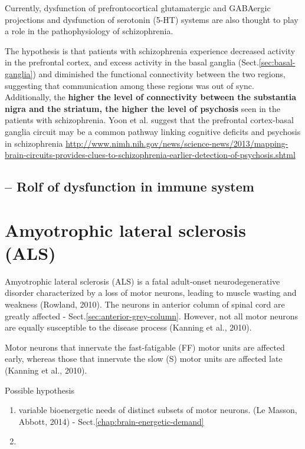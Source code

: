 Currently, dysfunction of prefrontocortical glutamatergic and GABAergic
projections and dysfunction of serotonin (5-HT) systems are also thought to play
a role in the pathophysiology of schizophrenia.

The hypothesis is that patients with schizophrenia experience decreased activity
in the prefrontal cortex, and excess activity in the basal ganglia
(Sect.\ref{sec:basal-ganglia}) and diminished the functional connectivity
between the two regions, suggesting that communication among these regions was
out of sync.
Additionally, the {\bf higher the level of connectivity between the substantia
nigra and the striatum, the higher the level of psychosis} seen in the patients
with schizophrenia.  Yoon et al.
suggest that the prefrontal cortex-basal ganglia circuit may be a common pathway
linking cognitive deficits and psychosis in schizophrenia
\citep{yoon2013}
\url{http://www.nimh.nih.gov/news/science-news/2013/mapping-brain-circuits-provides-clues-to-schizophrenia-earlier-detection-of-psychosis.shtml}


\subsection{ -- Rolf of dysfunction in immune system}
\label{sec:schizophrenia-hypothesis-immune-role}
\section{Amyotrophic lateral sclerosis (ALS)}
\label{sec:ALS}

Amyotrophic lateral sclerosis (ALS) is a fatal adult-onset neurodegenerative
disorder characterized by a loss of motor neurons, leading to muscle wasting and
weakness (Rowland, 2010). The neurons in anterior column of spinal cord are
greatly affected - Sect.\ref{sec:anterior-grey-column}.
However, not all motor neurons are equally susceptible to the disease process
(Kanning et al., 2010).

Motor neurons that innervate the fast-fatigable (FF) motor units are affected
early, whereas those that innervate the slow (S) motor units are affected late
(Kanning et al., 2010). 

Possible hypothesis
\begin{enumerate}
  \item  variable bioenergetic needs of distinct subsets of motor
neurons. (Le Masson, Abbott, 2014) - Sect.\ref{chap:brain-energetic-demand}

  \item 
\end{enumerate}


